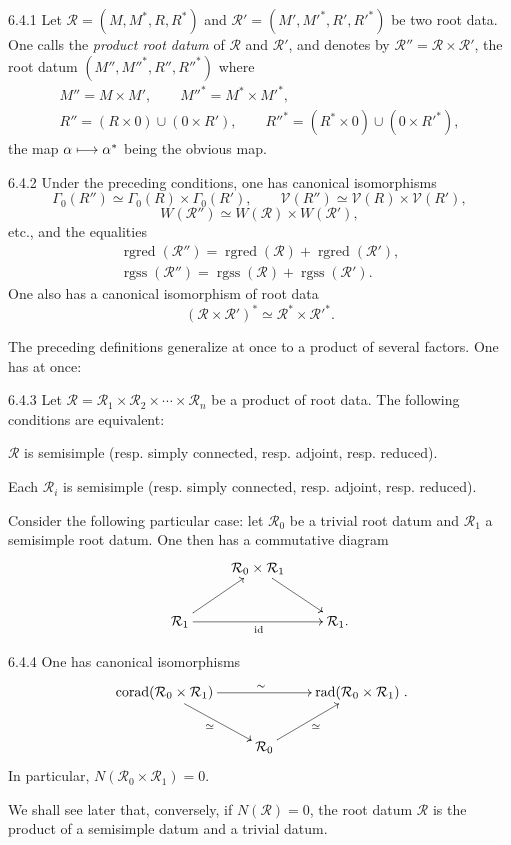 \begin{definition}{6.4.1}\label{XXI.6.4.1}
Let $\mathcal R=(M,M^*,R,R^*)$ and $\mathcal R'=(M',M'^*,R',R'^*)$ be two root data. One calls the \emph{product root datum} of $\mathcal R$ and $\mathcal R'$, and denotes by $\mathcal R''=\mathcal R\times\mathcal R'$, the root datum $(M'',M''^*,R'',R''^*)$ where
\[
\begin{gathered}
M''=M\times M',\qquad M''^*=M^*\times M'^*,\\
R''=(R\times0)\cup(0\times R'),\qquad R''^*=(R^*\times0)\cup(0\times R'^*),
\end{gathered}
\]
the map $\alpha\longmapsto\alpha^*$ being the obvious map.
\end{definition}
\begin{proposition}{6.4.2}\label{XXI.6.4.2}
Under the preceding conditions, one has canonical isomorphisms
\[
\Gamma_0(R'')\simeq\Gamma_0(R)\times\Gamma_0(R'),\qquad
\mathcal V(R'')\simeq\mathcal V(R)\times\mathcal V(R'),
\]
\[
W(\mathcal R'')\simeq W(\mathcal R)\times W(\mathcal R'),
\]
etc., and the equalities
\[
\begin{gathered}
\operatorname{rgred}(\mathcal R'')=\operatorname{rgred}(\mathcal R)+\operatorname{rgred}(\mathcal R'),\\
\operatorname{rgss}(\mathcal R'')=\operatorname{rgss}(\mathcal R)+\operatorname{rgss}(\mathcal R').
\end{gathered}
\]
One also has a canonical isomorphism of root data
\[
(\mathcal R\times\mathcal R')^*\simeq\mathcal R^*\times\mathcal R'^*.
\]
\end{proposition}
The preceding definitions generalize at once to a product of several factors. One has at once:
\begin{proposition}{6.4.3}\label{XXI.6.4.3}
Let $\mathcal R=\mathcal R_1\times\mathcal R_2\times\cdots\times\mathcal R_n$ be a product of root data. The following conditions are equivalent:
\begin{enumeratei}
\item $\mathcal R$ is semisimple (resp. simply connected, resp. adjoint, resp. reduced).
\item Each $\mathcal R_i$ is semisimple (resp. simply connected, resp. adjoint, resp. reduced).
\end{enumeratei}
\end{proposition}
Consider the following particular case: let $\mathcal R_0$ be a trivial root datum and $\mathcal R_1$ a semisimple root datum. One then has a commutative diagram
\[
\xymatrix{&\mathcal R_0\times\mathcal R_1\ar[dr]&\\
\mathcal R_1\ar[ur]\ar[rr]_{\mathrm{id}}&&\mathcal R_1.}
\]
\begin{lemma}{6.4.4}\label{XXI.6.4.4}
One has canonical isomorphisms
\[
\xymatrix{\operatorname{corad}(\mathcal R_0\times\mathcal R_1)\ar[rr]^{\sim}\ar[dr]_{\simeq}&&\operatorname{rad}(\mathcal R_0\times\mathcal R_1)\\
&\mathcal R_0\ar[ur]_{\simeq}&}.
\]
In particular, $N(\mathcal R_0\times\mathcal R_1)=0$.
\end{lemma}
We shall see later that, conversely, if $N(\mathcal R)=0$, the root datum $\mathcal R$ is the product of a semisimple datum and a trivial datum.

